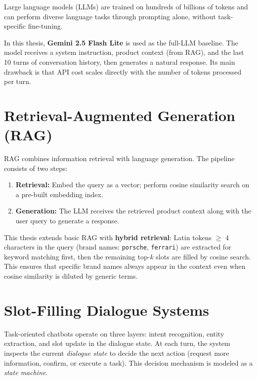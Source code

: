 \documentclass[12pt, a4paper]{report}
\begin{document}
Large language models (LLMs) \cite{google2024gemini} are trained on hundreds
of billions of tokens and can perform diverse language tasks through prompting
alone, without task-specific fine-tuning.

In this thesis, \textbf{Gemini 2.5 Flash Lite} is used as the full-LLM baseline.
The model receives a system instruction, product context (from RAG),
and the last 10 turns of conversation history, then generates a natural response.
Its main drawback is that API cost scales directly with the number of tokens
processed per turn.

\section{Retrieval-Augmented Generation (RAG)}

RAG \cite{lewis2020rag} combines information retrieval with language generation.
The pipeline consists of two steps:

\begin{enumerate}
  \item \textbf{Retrieval:} Embed the query as a vector;
        perform cosine similarity search on a pre-built embedding index.
  \item \textbf{Generation:} The LLM receives the retrieved product context
        along with the user query to generate a response.
\end{enumerate}

This thesis extends basic RAG with \textbf{hybrid retrieval}:
Latin tokens $\geq$ 4 characters in the query (brand names: \texttt{porsche}, \texttt{ferrari})
are extracted for keyword matching first,
then the remaining top-$k$ slots are filled by cosine search.
This ensures that specific brand names always appear in the context
even when cosine similarity is diluted by generic terms.

\section{Slot-Filling Dialogue Systems}

Task-oriented chatbots operate on three layers:
intent recognition, entity extraction, and slot update in the dialogue state.
At each turn, the system inspects the current \textit{dialogue state}
to decide the next action (request more information, confirm, or execute a task).
This decision mechanism is modeled as a \textit{state machine}.

\end{document}
